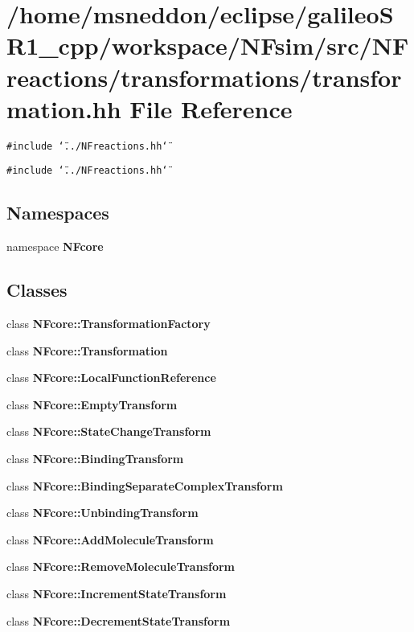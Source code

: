 \section{/home/msneddon/eclipse/galileoSR1\_\-cpp/workspace/NFsim/src/NFreactions/transformations/transformation.hh File Reference}
\label{transformation_8hh}


{\tt \#include \char`\"{}../NFreactions.hh\char`\"{}}\par
{\tt \#include \char`\"{}../NFreactions.hh\char`\"{}}\par
\subsection*{Namespaces}
\begin{CompactItemize}
\item 
namespace {\bf NFcore}
\end{CompactItemize}
\subsection*{Classes}
\begin{CompactItemize}
\item 
class {\bf NFcore::TransformationFactory}
\item 
class {\bf NFcore::Transformation}
\item 
class {\bf NFcore::LocalFunctionReference}
\item 
class {\bf NFcore::EmptyTransform}
\item 
class {\bf NFcore::StateChangeTransform}
\item 
class {\bf NFcore::BindingTransform}
\item 
class {\bf NFcore::BindingSeparateComplexTransform}
\item 
class {\bf NFcore::UnbindingTransform}
\item 
class {\bf NFcore::AddMoleculeTransform}
\item 
class {\bf NFcore::RemoveMoleculeTransform}
\item 
class {\bf NFcore::IncrementStateTransform}
\item 
class {\bf NFcore::DecrementStateTransform}
\end{CompactItemize}
